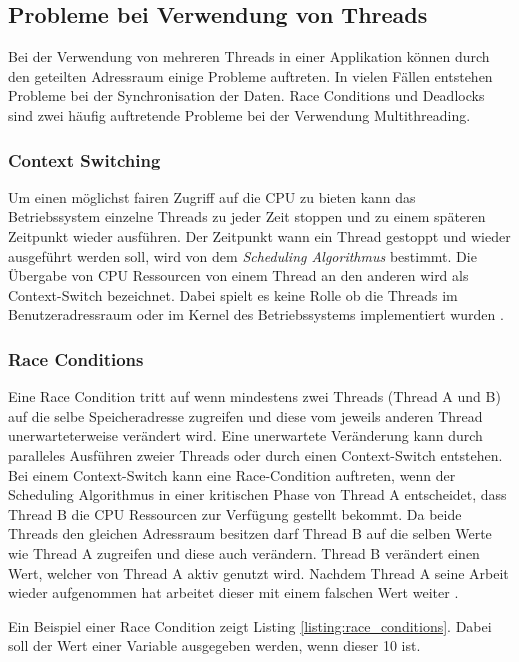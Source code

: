 \subsection{Probleme bei Verwendung von Threads}
Bei der Verwendung von mehreren Threads in einer Applikation können durch den geteilten Adressraum einige Probleme auftreten. In vielen Fällen entstehen Probleme bei der Synchronisation der Daten. Race Conditions und Deadlocks sind zwei häufig auftretende Probleme bei der Verwendung Multithreading. 

\subsubsection{Context Switching}
Um einen möglichst fairen Zugriff auf die CPU zu bieten kann das Betriebssystem einzelne Threads zu jeder Zeit stoppen und zu einem späteren Zeitpunkt wieder ausführen. Der Zeitpunkt wann ein Thread gestoppt und wieder ausgeführt werden soll, wird von dem \emph{Scheduling Algorithmus} bestimmt. Die Übergabe von CPU Ressourcen von einem Thread an den anderen wird als Context-Switch bezeichnet. Dabei spielt es keine Rolle ob die Threads im Benutzeradressraum oder im Kernel des Betriebssystems implementiert wurden \cite[p. 23]{Sto2013}.

\subsubsection{Race Conditions}

Eine Race Condition tritt auf wenn mindestens zwei Threads (Thread A und B) auf die selbe Speicheradresse zugreifen und diese vom jeweils anderen Thread unerwarteterweise verändert wird. Eine unerwartete Veränderung kann durch paralleles Ausführen zweier Threads oder durch einen Context-Switch entstehen. Bei einem Context-Switch kann eine Race-Condition auftreten, wenn der Scheduling Algorithmus in einer kritischen Phase von Thread A entscheidet, dass Thread B die CPU Ressourcen zur Verfügung gestellt bekommt. Da beide Threads den gleichen Adressraum besitzen darf Thread B auf die selben Werte wie Thread A zugreifen und diese auch verändern.  Thread B verändert einen Wert, welcher von Thread A aktiv genutzt wird. Nachdem Thread A seine Arbeit wieder aufgenommen hat arbeitet dieser mit einem falschen Wert weiter \cite[p. 89]{tan09}. 

Ein Beispiel einer Race Condition zeigt Listing \ref{listing:race_conditions}. Dabei soll der Wert einer Variable ausgegeben werden, wenn dieser 10 ist.

